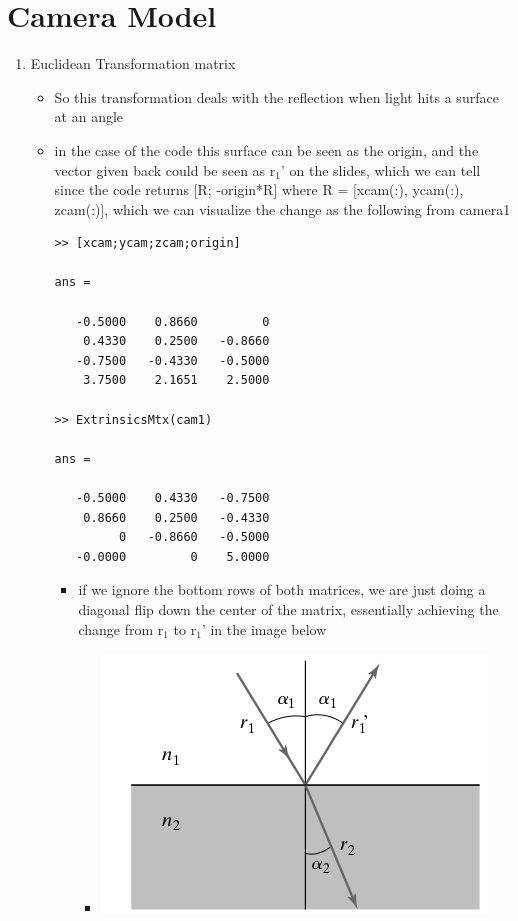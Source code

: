 \documentclass{article}
\begin{document}
\section{Camera Model}
\label{sec-4}
\begin{enumerate}
\item Euclidean Transformation matrix
\label{sec-4-1}
\begin{itemize}
\item So this transformation deals with the reflection when light hits a
surface at an angle
\item in the case of the code this surface can be seen as the origin, and
the vector given back could be seen as r$_{\text{1}}$' on the slides, which we
can tell since the code returns [R; -origin*R] where R = [xcam(:),
ycam(:), zcam(:)], which we can visualize the change as the
following from camera1
\begin{verbatim}
>> [xcam;ycam;zcam;origin]

ans =

   -0.5000    0.8660         0
    0.4330    0.2500   -0.8660
   -0.7500   -0.4330   -0.5000
    3.7500    2.1651    2.5000

>> ExtrinsicsMtx(cam1)

ans =

   -0.5000    0.4330   -0.7500
    0.8660    0.2500   -0.4330
         0   -0.8660   -0.5000
   -0.0000         0    5.0000
\end{verbatim}
\begin{itemize}
\item if we ignore the bottom rows of both matrices, we are just doing a
diagonal flip down the center of the matrix, essentially
achieving the change from r$_{\text{1}}$ to r$_{\text{1}}$' in the image below
\begin{itemize}
\item \includegraphics[width=.9\linewidth]{reflected.png}
\end{itemize}


\end{itemize}
\end{itemize}
\end{enumerate}
\end{document}
